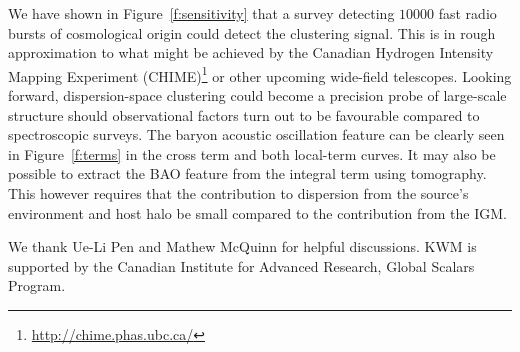 \documentclass[twocolumn,prl,floatfix]{revtex4-1}
\begin{document}
We have
shown in Figure~\ref{f:sensitivity}
that a survey detecting $10000$ fast radio bursts of cosmological
origin could detect the
clustering signal. This is in rough
approximation to what might be achieved by the Canadian Hydrogen Intensity
Mapping Experiment (CHIME)\footnote{\url{http://chime.phas.ubc.ca/}}
or other upcoming wide-field telescopes.
Looking forward, dispersion-space
clustering could become a precision probe of large-scale structure should
observational factors turn out to be favourable compared to spectroscopic
surveys. The baryon acoustic oscillation feature can be clearly seen in
Figure~\ref{f:terms} in the cross term and both
local-term curves. It may also be possible to extract the BAO feature
from the integral
term using tomography.
This however requires that the contribution to dispersion from
the source's environment and host halo be small compared to the
contribution from the IGM.


\begin{acknowledgments}

We thank Ue-Li Pen and Mathew McQuinn for helpful discussions.
%
KWM is supported by the Canadian Institute for Advanced Research, Global Scalars
Program.

\end{acknowledgments}




\end{document}
